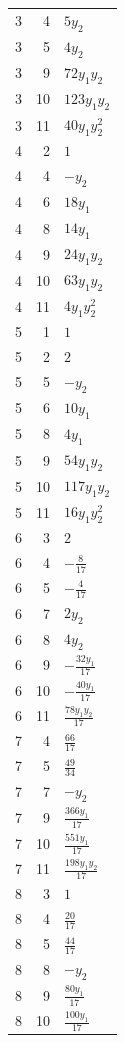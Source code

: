 \documentclass[10pt,a4paper]{article}
\begin{document}
{\begin{longtable}{rrp{125mm}}
3 & 4 & $5 y_{2}$\\
3 & 5 & $4 y_{2}$\\
3 & 9 & $72 y_{1} y_{2}$\\
3 & 10 & $123 y_{1} y_{2}$\\
3 & 11 & $40 y_{1} y_{2}^{2}$\\
4 & 2 & $1$\\
4 & 4 & $- y_{2}$\\
4 & 6 & $18 y_{1}$\\
4 & 8 & $14 y_{1}$\\
4 & 9 & $24 y_{1} y_{2}$\\
4 & 10 & $63 y_{1} y_{2}$\\
4 & 11 & $4 y_{1} y_{2}^{2}$\\
5 & 1 & $1$\\
5 & 2 & $2$\\
5 & 5 & $- y_{2}$\\
5 & 6 & $10 y_{1}$\\
5 & 8 & $4 y_{1}$\\
5 & 9 & $54 y_{1} y_{2}$\\
5 & 10 & $117 y_{1} y_{2}$\\
5 & 11 & $16 y_{1} y_{2}^{2}$\\
6 & 3 & $2$\\
6 & 4 & $- \frac{8}{17}$\\
6 & 5 & $- \frac{4}{17}$\\
6 & 7 & $2 y_{2}$\\
6 & 8 & $4 y_{2}$\\
6 & 9 & $- \frac{32 y_{1}}{17}$\\
6 & 10 & $- \frac{40 y_{1}}{17}$\\
6 & 11 & $\frac{78 y_{1} y_{2}}{17}$\\
7 & 4 & $\frac{66}{17}$\\
7 & 5 & $\frac{49}{34}$\\
7 & 7 & $- y_{2}$\\
7 & 9 & $\frac{366 y_{1}}{17}$\\
7 & 10 & $\frac{551 y_{1}}{17}$\\
7 & 11 & $\frac{198 y_{1} y_{2}}{17}$\\
8 & 3 & $1$\\
8 & 4 & $\frac{20}{17}$\\
8 & 5 & $\frac{44}{17}$\\
8 & 8 & $- y_{2}$\\
8 & 9 & $\frac{80 y_{1}}{17}$\\
8 & 10 & $\frac{100 y_{1}}{17}$\\

\end{longtable}}
\end{document}
